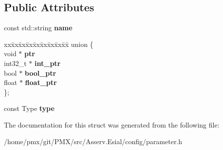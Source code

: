 \subsection*{Public Attributes}
\begin{DoxyCompactItemize}
\item 
\mbox{\label{structParameter_ae8b833b543d3e51c2fbde7bb51a5ec37}} 
const std\+::string {\bfseries name}
\item 
\mbox{\label{structParameter_a6f7222724272c384a2a3b9e5e8543457}} 
\begin{tabbing}
xx\=xx\=xx\=xx\=xx\=xx\=xx\=xx\=xx\=\kill
union \{\\
\>void $\ast$ {\bfseries ptr}\\
\>int32\_t $\ast$ {\bfseries int\_ptr}\\
\>bool $\ast$ {\bfseries bool\_ptr}\\
\>float $\ast$ {\bfseries float\_ptr}\\
\}; \\

\end{tabbing}\item 
\mbox{\label{structParameter_a4cf1aee829f88b530bef0ba50413724a}} 
const Type {\bfseries type}
\end{DoxyCompactItemize}


The documentation for this struct was generated from the following file\+:\begin{DoxyCompactItemize}
\item 
/home/pmx/git/\+P\+M\+X/src/\+Asserv.\+Esial/config/parameter.\+h\end{DoxyCompactItemize}
